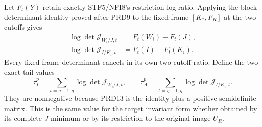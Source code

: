 \documentclass[11pt,a4paper]{article}
\begin{document}
Let $F_t(Y)$ retain exactly STF5/NFI8's restriction log ratio.
Applying the block determinant identity proved after PRD9 to
the fixed frame $[K_*,F_R]$ at the two cutoffs gives
\[
\begin{aligned}
 \log\det\mathcal J_{W_i/J,t}&=F_t(W_i)-F_t(J),\\
 \log\det\mathcal J_{I/K_i,t}&=F_t(I)-F_t(K_i).
\end{aligned}                                                    \tag{PRD15}
\]
Every fixed frame determinant cancels in its own two-cutoff
ratio. Define the two exact tail values
\[
 \tau_I^p=\sum_{t=q-1,q}\log\det\mathcal J_{W_i/J,t},\qquad
 \tau_A^p=\sum_{t=q-1,q}\log\det\mathcal J_{I/K_i,t}.
                                                               \tag{PRD16}
\]
They are nonnegative because PRD13 is the identity plus a positive
semidefinite matrix. This is the same value for the target invariant
form whether obtained by its complete $J$ minimum or by its
restriction to the original image $U_R$.
\end{document}
